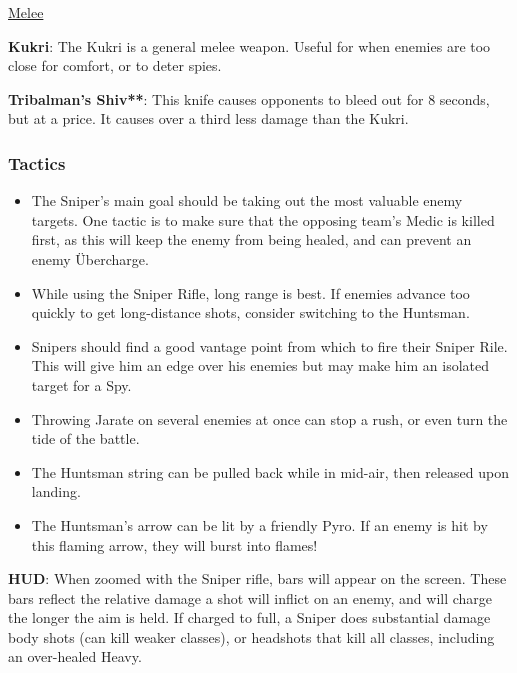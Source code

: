 \begin {center}
\underline {Melee}
\end {center}

{\bf Kukri}: The Kukri is a general melee weapon. Useful for when enemies are too close for comfort, or to deter spies.

{\bf Tribalman's Shiv**}: This knife causes opponents to bleed out for 8 seconds, but at a price. It causes over a third less damage than the Kukri.

\subsubsection {Tactics}
\begin {itemize}

\item The Sniper's main goal should be taking out the most valuable enemy targets. One tactic is to make sure that the opposing team's Medic is killed first, as this will keep the enemy from being healed, and can prevent an enemy Übercharge.

\item While using the Sniper Rifle, long range is best. If enemies advance too quickly to get long-distance shots, consider switching to the Huntsman.

\item Snipers should find a good vantage point from which to fire their Sniper Rile. This will give him an edge over his enemies but may make him an isolated target for a Spy.

\item Throwing Jarate on several enemies at once can stop a rush, or even turn the tide of the battle.

\item The Huntsman string can be pulled back while in mid-air, then released upon landing.

\item The Huntsman's arrow can be lit by a friendly Pyro. If an enemy is hit by this flaming arrow, they will burst into flames!
\end {itemize}

{\bf HUD}: When zoomed with the Sniper rifle, bars will appear on the screen. These bars reflect the relative damage a shot will inflict on an enemy, and will charge the longer the aim is held. If charged to full, a Sniper does substantial damage body shots (can kill weaker classes), or headshots that kill all classes, including an over-healed Heavy.